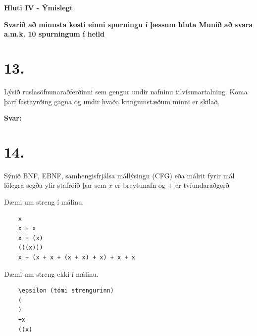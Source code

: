 \documentclass{article}
\newcommand{\sv}{\textbf{Svar:}}
\newcommand{\bo}[1]{\textbf{#1}}
\begin{document}
 \begin{center}
    \bo{Hluti IV - Ýmislegt}


    \bo{Svarið að minnsta kosti einni spurningu í þessum hluta 
    Munið að svara a.m.k. 10 spurningum í heild}
 \end{center}

 \section{13.}
 Lýsið ruslasöfnunaraðferðinni sem gengur undir nafninu 
 tilvísunartalning. Koma þarf fastayrðing gagna og undir hvaða 
 kringumstæðum minni er skilað.


 \sv

 \newpage
 \section{14.}
 Sýnið BNF, EBNF, samhengisfrjálsa mállýsingu (CFG) eða málrit
 fyrir mál lölegra segða yfir stafróið  þar sem $x$ er
 breytunafn og $+$ er tvíundaraðgerð

 Dæmi um streng í málinu.
 \begin{verbatim}
    x
    x + x
    x + (x)
    (((x)))
    x + (x + x + (x + x) + x) + x + x
 \end{verbatim}
 
 Dæmi um streng ekki í málinu.

\begin{verbatim}
    \epsilon (tómi strengurinn)
    (
    )
    +x
    ((x)
 \end{verbatim}
\end{document}
